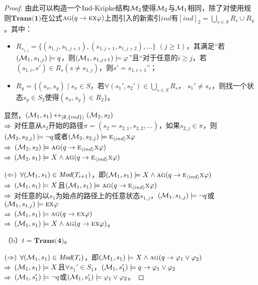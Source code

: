 \begin{proof}
	由此可以构造一个$\textrm{Ind}$-Kripke结构${\cal M}_2$使得${\cal M}_2$与${\cal M}_1$相同，除了对使用规则$\textbf{Trans(1)}$在公式$\textsc{a}\textsc{g}(q \rightarrow \textsc{e} \textsc{x} \varphi)$上而引入的新索引$ind$有$[ind]_2=\bigcup_{s\in S} R_s \cup R_y$。其中：
	\begin{itemize}
		\item $R_{s_{1,j}}=\{(s_{1,j}, s_{1,j+1}), (s_{1,j+1}, s_{1,j+2}),\dots\}$ $(j\geq 1)$，其满足“若$({\cal M}_1,s_{1,j}) \models q$，则$({\cal M}_1,s_{1,j+1}) \models \varphi$”且“对于任意的$i\geq j$，若$(s_{1,i}, s') \in R_s (s \not= s_{1,j})$，则$s'=s_{1,i+1}$”；
		\item $R_y=\{(s_x,s_y)\mid s_x\in S$，若$\forall(s_1',s_2') \in \bigcup_{s\in S} R_s$， $s_1'\not= s_x$，则找一个状态$s_y\in S_2$使得$(s_x,s_y)\in R_2\}$。
	\end{itemize}

显然，$({\cal M}_1,s_1) \leftrightarrow_{{\langle{\emptyset,\{ind\}}\rangle}} ({\cal M}_2,s_2)$\\
$\Rightarrow$ 对任意从$s_2$开始的路径$\pi=( s_2= s_{2,1} , s_{2,2}, \dots)$，如果$s_{2,j} \in \pi$，则$({\cal M}_2,s_{2,j}) \models \neg q$或者$({\cal M}_2,s_{2,j}) \models \textsc{e}_{{\langle{ind}\rangle}} \textsc{x} \varphi$\\
$\Rightarrow$ $({\cal M}_2,s_2)\models \textsc{a}\textsc{g}(q \rightarrow \textsc{e}_{{\langle{ind}\rangle}} \textsc{x} \varphi)$\\
$\Rightarrow$ $({\cal M}_2,s_1) \models X \wedge \textsc{a}\textsc{g}(q \rightarrow \textsc{e}_{{\langle{ind}\rangle}} \textsc{x} \varphi)$

$(\Leftarrow)$ $\forall ({\cal M}_1,s_1) \in \textit{Mod}(T_{i+1})$，即$({\cal M}_1,s_1) \models X \wedge \textsc{a} \textsc{g}(q \rightarrow \textsc{e}_{{\langle{ind}\rangle}} \textsc{x} \varphi )$\\
$\Rightarrow$ $({\cal M}_1,s_1) \models X$且$({\cal M}_1,s_1) \models \textsc{a} \textsc{g}(q \rightarrow \textsc{e}_{{\langle{ind}\rangle}} \textsc{x} \varphi)$\\
$\Rightarrow$ 对任意的以$s_1$为始点的路径上的任意状态$s_{1,j}$，$({\cal M}_1,s_{1,j}) \models \neg q$或$({\cal M}_1,s_{1,j}) \models \textsc{e}\textsc{x}\varphi$\\
$\Rightarrow$ $({\cal M}_1,s_1) \models \textsc{a}\textsc{g}(q \rightarrow \textsc{e} \textsc{x} \varphi)$\\
$\Rightarrow$ $({\cal M}_1,s_1) \models X \wedge \textsc{a}\textsc{g}(q \rightarrow \textsc{e} \textsc{x} \varphi)$。

	（b）$t=\textbf{Trans(4)}$。
	
   $(\Rightarrow)$	$\forall({\cal M}_1,s_1) \in \textit{Mod}(T_i)$，即$({\cal M}_1,s_1) \models X \wedge \textsc{a}\textsc{g} (q \rightarrow \varphi_1 \vee \varphi_2)$ \\
   $\Rightarrow$ $({\cal M}_1,s_1) \models X$且$\forall s_1'\in S_1$，$({\cal M}_1, s_1') \models q \rightarrow \varphi_1 \vee \varphi_2$\\
   $\Rightarrow$ $({\cal M}_1,s_1')\models \neg q$或$({\cal M}_1,s_1')\models \varphi_1 \vee \varphi_2$。
   

\end{proof}
